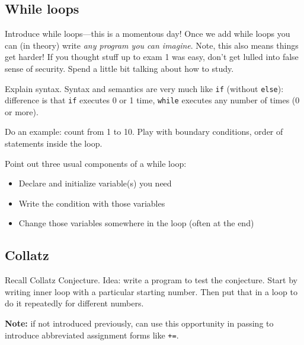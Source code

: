 \documentclass{article}
\newcommand{\notready}{\textcolor{red}{\XSolidBold}\xspace}
\newcommand{\shortdayname}{%
  \ifthenelse{\equal{\datedayname}{Thursday}}{Th}{\StrLeft{\datedayname}{1}}}
\newcommand{\shortmonthname}{\StrLeft{\datemonthname}{3}}
\newcommand{\showdate}{\thedateday\ \shortmonthname}
\newcommand{\showdowdate}{\shortdayname\ \showdate}
\newcommand{\advanceMWF}{
  \ifthenelse{\equal{\datedayname}{Monday}}
  {\nextdate\nextdate}
  {\ifthenelse{\equal{\datedayname}{Wednesday}}
    {\nextdate\nextdate}
    {\ifthenelse{\equal{\datedayname}{Thursday}}
      {\nextdate}
      {\nextdate\nextdate\nextdate}}}}
\newcommand{\firstclass}[1]{\section*{#1 (\showdowdate)}}
\newcommand{\class}[1]{\advanceMWF\firstclass{#1}}
\begin{document}
\subsection*{While loops}

Introduce while loops---this is a momentous day!  Once we add while
loops you can (in theory) write \emph{any program you can imagine}.
Note, this also means things get harder!  If you thought stuff up to
exam 1 was easy, don't get lulled into false sense of security. Spend
a little bit talking about how to study.

Explain syntax.  Syntax and semantics are very much like \verb|if|
(without \verb|else|): difference is that \verb|if| executes 0 or 1
time, \verb|while| executes any number of times (0 or more).

Do an example: count from 1 to 10.  Play with boundary conditions,
order of statements inside the loop.



Point out three usual components of a while loop:
\begin{itemize}
\item Declare and initialize variable(s) you need
\item Write the condition with those variables
\item Change those variables somewhere in the loop (often at the
  end)
\end{itemize}

\subsection*{Collatz}

Recall Collatz Conjecture.  Idea: write a program to test the
conjecture.  Start by writing inner loop with a particular starting
number.  Then put that in a loop to do it repeatedly for different
numbers.

\textbf{Note:} if not introduced previously, can use this opportunity
in passing to introduce abbreviated assignment forms like \verb|+=|.
\end{document}
